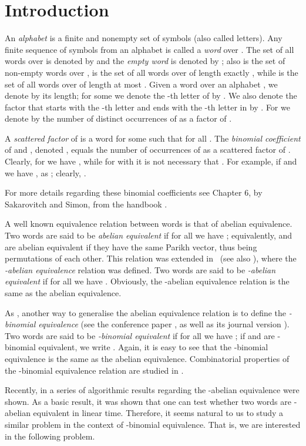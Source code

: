 \documentclass[runningheads]{llncs}
\begin{document}
\section{Introduction}
An {\it alphabet} is a finite and nonempty set of symbols (also called letters). Any finite sequence of symbols from an alphabet  is called a {\it word} over . The set of all words over  is denoted by  and the {\em empty word} is denoted by ; also  is the set of non-empty words over ,  is the set of all words over  of length exactly , while  is the set of all words over  of length at most . Given a word  over an alphabet , we denote by  its length; for some  we denote the -th letter of  by . We also denote the factor that starts with the -th letter and ends with the -th letter in  by . For  we denote by  the number of distinct occurrences of  as a factor of . 

A \emph{scattered factor} of  is a word  for some  such that  for all . The \emph{binomial coefficient} of  and , denoted , equals the number of occurrences of  as a scattered factor of . Clearly, for  we have , while for  with  it is not necessary that . 
For example, if  and  we have , as ; clearly, .

For more details regarding these binomial coefficients see Chapter 6, by Sakarovitch and Simon, from the handbook \cite{Loth97}.

A well known equivalence relation between words is that of abelian equivalence. Two words  are said to be \emph{abelian equivalent} if for all  we have  ; equivalently,  and  are abelian equivalent if they have the same Parikh vector, thus being permutations of each other. This relation was extended in~\cite{KSZ13} (see also \cite{HuKaSaSa11}), where the \emph{-abelian equivalence} relation was defined. Two words  are said to be \emph{-abelian equivalent} if for all  we have . Obviously, the -abelian equivalence relation is the same as the abelian equivalence.

As , another way to generalise the abelian equivalence relation is to define the \emph{-binomial equivalence} (see the conference paper \cite{RigoWORDS}, as well as its journal version \cite{rigo1}). Two words  are said to be \emph{-binomial equivalent} if for all  we have ; if  and  are -binomial equivalent, we write . Again, it is easy to see that the -binomial equivalence is the same as the abelian equivalence. Combinatorial properties of the -binomial equivalence relation are studied in \cite{RigoWORDS,rigo1,rigo2}. 

Recently, in \cite{EhMaMeNo14,EMMN15} a series of algorithmic results regarding the -abelian equivalence were shown. As a basic result, it was shown that one can test whether two words are -abelian equivalent in linear time. Therefore, it seems natural to us to study a similar problem in the context of -binomial equivalence. That is, we are interested in the following problem.
\end{document}
